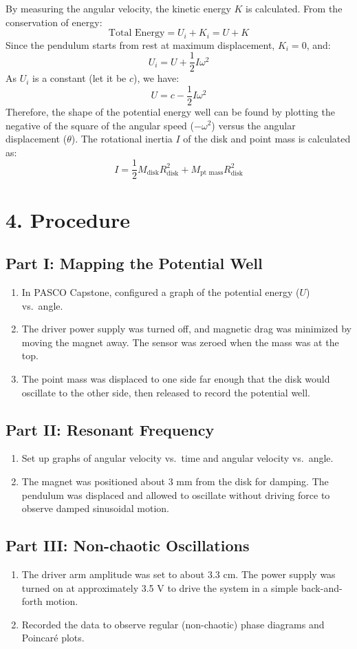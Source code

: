 \documentclass[12pt, a4paper]{article}
\begin{document}
By measuring the angular velocity, the kinetic energy $K$ is calculated. From the conservation of energy:
\[ \text{Total Energy} = U_i + K_i = U + K \]
Since the pendulum starts from rest at maximum displacement, $K_i = 0$, and:
\[ U_i = U + \frac{1}{2} I \omega^2 \]
As $U_i$ is a constant (let it be $c$), we have:
\[ U = c - \frac{1}{2} I \omega^2 \]
Therefore, the shape of the potential energy well can be found by plotting the negative of the square of the angular speed ($-\omega^2$) versus the angular displacement ($\theta$). The rotational inertia $I$ of the disk and point mass is calculated as:
\[ I = \frac{1}{2} M_{\text{disk}} R_{\text{disk}}^2 + M_{\text{pt mass}} R_{\text{disk}}^2 \]

\section*{4. Procedure}

\subsection*{Part I: Mapping the Potential Well}
\begin{enumerate}
    \item In PASCO Capstone, configured a graph of the potential energy ($U$) vs.\ angle.
    \item The driver power supply was turned off, and magnetic drag was minimized by moving the magnet away. The sensor was zeroed when the mass was at the top.
    \item The point mass was displaced to one side far enough that the disk would oscillate to the other side, then released to record the potential well.
\end{enumerate}

\subsection*{Part II: Resonant Frequency}
\begin{enumerate}
    \item Set up graphs of angular velocity vs.\ time and angular velocity vs.\ angle.
    \item The magnet was positioned about 3 mm from the disk for damping. The pendulum was displaced and allowed to oscillate without driving force to observe damped sinusoidal motion.
\end{enumerate}

\subsection*{Part III: Non-chaotic Oscillations}
\begin{enumerate}
    \item The driver arm amplitude was set to about 3.3 cm. The power supply was turned on at approximately 3.5 V to drive the system in a simple back-and-forth motion.
    \item Recorded the data to observe regular (non-chaotic) phase diagrams and Poincar\'e plots.
\end{enumerate}
\end{document}
